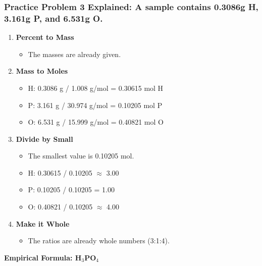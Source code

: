 \documentclass{article}
\begin{document}
\subsubsection*{Practice Problem 3 Explained: A sample contains 0.3086g H, 3.161g P, and 6.531g O.}
\begin{enumerate}[label=Step \arabic*:, itemsep=5pt]
    \item \textbf{Percent to Mass}
    \begin{itemize}
        \item The masses are already given.
    \end{itemize}
    \item \textbf{Mass to Moles}
    \begin{itemize}
        \item H: 0.3086 g / 1.008 g/mol = 0.30615 mol H
        \item P: 3.161 g / 30.974 g/mol = 0.10205 mol P
        \item O: 6.531 g / 15.999 g/mol = 0.40821 mol O
    \end{itemize}
    \item \textbf{Divide by Small}
    \begin{itemize}
        \item The smallest value is 0.10205 mol.
        \item H: 0.30615 / 0.10205 $\approx$ 3.00
        \item P: 0.10205 / 0.10205 = 1.00
        \item O: 0.40821 / 0.10205 $\approx$ 4.00
    \end{itemize}
    \item \textbf{Make it Whole}
    \begin{itemize}
        \item The ratios are already whole numbers (3:1:4).
    \end{itemize}
\end{enumerate}
\textbf{Empirical Formula: H$_3$PO$_4$}


\end{document}
